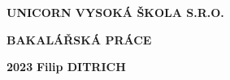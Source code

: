 \pagestyle{empty}
\begin{center}
{\Large\bfseries\MakeUppercase{Unicorn Vysoká škola s.r.o.}}
    \vfill

    {\Huge\bfseries\MakeUppercase{Bakalářská práce}} \\

    \vfill

    \noindent\begin{minipage}{\textwidth}
         \begin{Large}
             \textbf{2023} \hfill \textbf{Filip \MakeUppercase{Ditrich}}
         \end{Large}
    \end{minipage}
\end{center}
